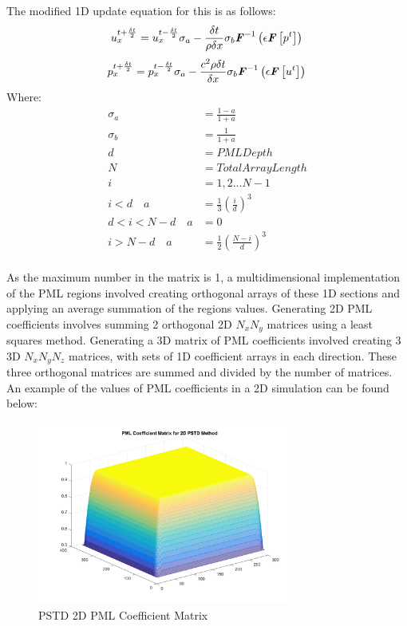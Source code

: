 The modified 1D update equation for this is as follows:\\
\begin{equation}
u^{t + \frac{\delta t}{2}}_{x} = u^{t - \frac{\delta t}{2}}_{x} \sigma_a - \frac{\delta t}{\rho \delta x} \sigma_b \textbf{\textit{F}}^{-1}\left(\epsilon \textbf{\textit{F}}\left[p^{t}\right] \right)\\
\end{equation}
\begin{equation}
p^{t + \frac{\delta t}{2}}_{x} = p^{t - \frac{\delta t}{2}}_{x} \sigma_a - \frac{c^2 \rho \delta t}{\delta x} \sigma_b \textbf{\textit{F}}^{-1}\left( \epsilon \textbf{\textit{F}} \left[ u^{t} \right] \right)\\
\end{equation}
Where:\\
\begin{equation}
\begin{aligned}
\sigma_a & = \frac{1-a}{1+a} \\
\sigma_b & = \frac{1}{1 + a} \\
d & = PML Depth\\
N & = Total Array Length \\
i & = 1,2... N-1\\
i < d \quad a & = \frac{1}{3} \left( \frac{i}{d} \right)^3\\
d < i < N - d \quad a & = 0\\
i > N-d \quad a & = \frac{1}{2} \left( \frac{N - i}{d} \right) ^3 \\ 
\end{aligned}
\end{equation}

As the maximum number in the matrix is 1, a multidimensional implementation of the PML regions involved creating orthogonal arrays of these 1D sections and applying an average summation of the regions values. Generating 2D PML coefficients involves summing 2 orthogonal 2D $N_x N_y $ matrices using a least squares method. Generating a 3D matrix of PML coefficients involved creating 3 3D $N_x N_y N_z $ matrices, with sets of 1D coefficient arrays in each direction. These three orthogonal matrices are summed and divided by the number of matrices. An example of the values of PML coefficients in a 2D simulation can be found below:\\
\begin{figure}[H]
\centering
  \includegraphics[width=0.75\textwidth]{./graphics/pstd2dpmlmatrix.png}
  \caption{PSTD 2D PML Coefficient Matrix}
\end{figure}


